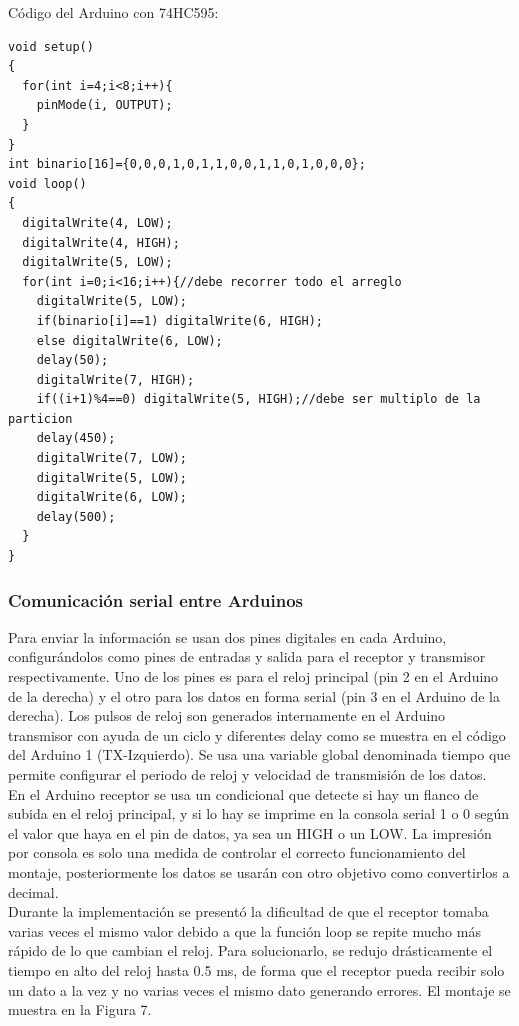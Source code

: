 \documentclass{article}
\begin{document}
\noindent
Código del Arduino con 74HC595:

\begin{lstlisting}[style=C++]
void setup()
{
  for(int i=4;i<8;i++){
  	pinMode(i, OUTPUT);
  }  
}
int binario[16]={0,0,0,1,0,1,1,0,0,1,1,0,1,0,0,0};
void loop()
{
  digitalWrite(4, LOW);
  digitalWrite(4, HIGH);
  digitalWrite(5, LOW);
  for(int i=0;i<16;i++){//debe recorrer todo el arreglo
    digitalWrite(5, LOW);
    if(binario[i]==1) digitalWrite(6, HIGH);
    else digitalWrite(6, LOW);
    delay(50);
    digitalWrite(7, HIGH);
    if((i+1)%4==0) digitalWrite(5, HIGH);//debe ser multiplo de la particion
    delay(450);
    digitalWrite(7, LOW);
    digitalWrite(5, LOW);
    digitalWrite(6, LOW);
    delay(500); 
  }
}
\end{lstlisting}

\subsubsection{Comunicación serial entre Arduinos}
Para enviar la información se usan dos pines digitales en cada Arduino, configurándolos como pines de entradas y salida para el receptor y transmisor respectivamente. Uno de los pines es para el reloj principal (pin 2 en el Arduino de la derecha)  y el otro para los datos en forma serial (pin 3 en el Arduino de la derecha). Los pulsos de reloj son generados internamente en el Arduino transmisor con ayuda de un ciclo y diferentes delay como se muestra en el código del Arduino 1 (TX-Izquierdo).
Se usa una variable global denominada tiempo que permite configurar el periodo de reloj y velocidad de transmisión de los datos.\\

En el Arduino receptor se usa un condicional que detecte si hay un flanco de subida en el reloj principal, y si lo hay se imprime en la consola serial 1 o 0 según el valor que haya en el pin de datos, ya sea un HIGH o un LOW. La impresión por consola es solo una medida de controlar el correcto funcionamiento del montaje, posteriormente los datos se usarán con otro objetivo como convertirlos a decimal.\\

Durante la implementación se presentó la dificultad de que el receptor tomaba varias veces el mismo valor debido a que la función loop se repite mucho más rápido de lo que cambian el reloj. Para solucionarlo, se redujo drásticamente el tiempo en alto del reloj hasta 0.5 ms, de forma que el receptor pueda recibir solo un dato a la vez y no varias veces el mismo dato generando errores. El montaje se muestra en la Figura 7.
\end{document}
